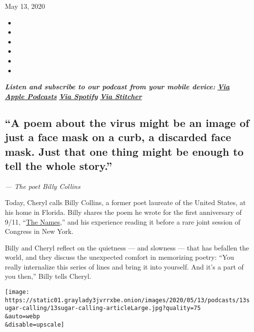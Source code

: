May 13, 2020

\begin{itemize}
\item
\item
\item
\item
\item
\item
\end{itemize}

\emph{\textbf{Listen and subscribe to our podcast from your mobile
device:}}
\textbf{\href{https://podcasts.apple.com/us/podcast/sugar-calling/id1505881384}{\emph{Via
Apple Podcasts}}} \emph{\textbf{\textbar{}}}
\textbf{\href{https://open.spotify.com/show/4U8hPiNGIBvTS9zLeiDCN7?si=gRyigD47SPWl-QWgNjgt2w}{\emph{Via
Spotify}}} \emph{\textbf{\textbar{}}}
\textbf{\href{https://www.stitcher.com/podcast/the-new-york-times/sugar-calling}{\emph{Via
Stitcher}}}

\hypertarget{a-poem-about-the-virus-might-be-an-image-of-just-a-face-mask-on-a-curb-a-discarded-face-mask-just-that-one-thing-might-be-enough-to-tell-the-whole-story}{%
\subsection{``A poem about the virus might be an image of just a face
mask on a curb, a discarded face mask. Just that one thing might be
enough to tell the whole
story.''}\label{a-poem-about-the-virus-might-be-an-image-of-just-a-face-mask-on-a-curb-a-discarded-face-mask-just-that-one-thing-might-be-enough-to-tell-the-whole-story}}

\emph{--- The poet Billy Collins}

Today, Cheryl calls Billy Collins, a former poet laureate of the United
States, at his home in Florida. Billy shares the poem he wrote for the
first anniversary of 9/11,
``\href{https://www.nytimes3xbfgragh.onion/2002/09/06/opinion/the-names.html}{The
Names},'' and his experience reading it before a rare joint session of
Congress in New York.

Billy and Cheryl reflect on the quietness --- and slowness --- that has
befallen the world, and they discuss the unexpected comfort in
memorizing poetry: ``You really internalize this series of lines and
bring it into yourself. And it's a part of you then,'' Billy tells
Cheryl.

\texttt{[image: https://static01.graylady3jvrrxbe.onion/images/2020/05/13/podcasts/13sugar-calling/13sugar-calling-articleLarge.jpg?quality=75\\\&auto=webp\\\&disable=upscale]}

